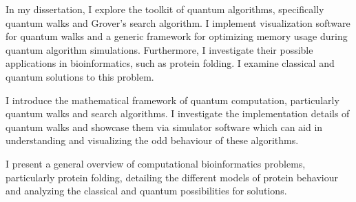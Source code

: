 In my dissertation, I explore the toolkit of quantum algorithms, specifically quantum walks and Grover's search algorithm. I implement visualization software for quantum walks and a generic framework for optimizing memory usage during quantum algorithm simulations. Furthermore, I investigate their possible applications in bioinformatics, such as protein folding. I examine classical and quantum solutions to this problem.

I introduce the mathematical framework of quantum computation, particularly quantum walks and search algorithms. I investigate the implementation details of quantum walks and showcase them via simulator software which can aid in understanding and visualizing the odd behaviour of these algorithms.

I present a general overview of computational bioinformatics problems, particularly protein folding, detailing the different models of protein behaviour and analyzing the classical and quantum possibilities for solutions.

\vfill
\selectthesislanguage

\setcounter{romanPage}{\value{page}}
